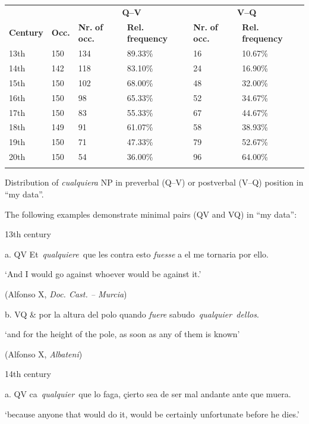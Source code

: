 \begin{table}
\begin{tabularx}{\textwidth}{XXXXXX}
\lsptoprule
\multicolumn{1}{c}{} &  & \multicolumn{2}{c}{ \textbf{Q–V}} & \multicolumn{2}{c}{ \textbf{V–Q}}\\
 \textbf{Century} & \textbf{Occ.} & \textbf{Nr.} \textbf{of} \textbf{occ.} & \textbf{Rel.} \textbf{frequency} & \textbf{Nr.} \textbf{of} \textbf{occ.} & \textbf{Rel.} \textbf{frequency}\\
 13th & 150 & 134 & 89.33\% & 16 & 10.67\%\\
 14th & 142 & 118 & 83.10\% & 24 & 16.90\%\\
 15th & 150 & 102 & 68.00\% & 48 & 32.00\%\\
 16th & 150 & 98 & 65.33\% & 52 & 34.67\%\\
 17th & 150 & 83 & 55.33\% & 67 & 44.67\%\\
 18th & 149 & 91 & 61.07\% & 58 & 38.93\%\\
 19th & 150 & 71 & 47.33\% & 79 & 52.67\%\\
 20th & 150 & 54 & 36.00\% & 96 & 64.00\%\\
\lspbottomrule
\end{tabularx}
\caption{\label{tab:} ~}Distribution of \textit{cualquiera} NP in preverbal (Q–V) or postverbal (V–Q) position in “my data”.
\end{table}

The following examples demonstrate minimal pairs (QV and VQ) in “my data”:

  13th century

  a.  QV  Et~\textit{qualquiere~}que les contra esto \textit{fuesse} a el me tornaria por ello. 

      ‘And I would go against whoever would be against it.’

      (Alfonso X, \textit{Doc. Cast. – Murcia})

  b.  VQ  \& por la altura del polo quando \textit{fuere} sabudo~\textit{qualquier~dellos}. 

      ‘and for the height of the pole, as soon as any of them is known’

      (Alfonso X, \textit{Albateni})

  14th century

  a.  QV  ca~\textit{qualquier~}que lo faga, çierto sea de ser mal andante ante que muera. 

      ‘because anyone that would do it, would be certainly unfortunate before he dies.’

